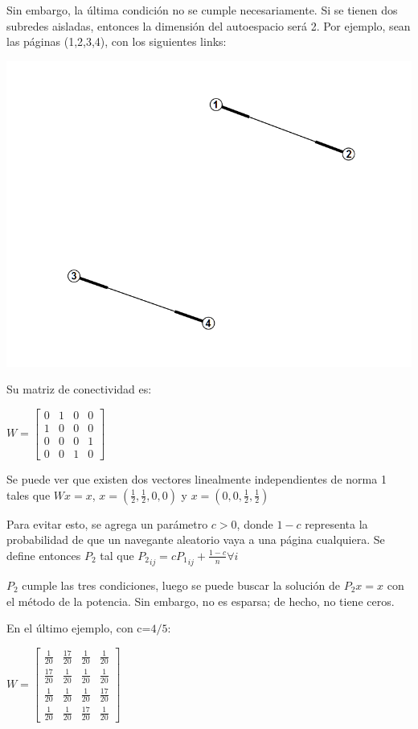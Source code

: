 \documentclass[a4paper]{article}
\begin{document}
Sin embargo, la última condición no se cumple necesariamente. Si se tienen dos subredes aisladas, entonces la dimensión del autoespacio será 2. Por ejemplo, sean las páginas (1,2,3,4), con los siguientes links: 

\includegraphics[scale=0.5]{img/Grafo2.png} 

Su matriz de conectividad es:
\begin{center}
$W=\begin{bmatrix} 0&1&0&0\\1&0&0&0\\ 0&0&0&1\\0&0&1&0\end{bmatrix}$
\end{center}
Se puede ver que existen dos vectores linealmente independientes de norma 1 tales que $Wx=x$, $x=\left( \frac{1}{2}, \frac{1}{2},0 ,0\right)$ y $x=\left(0,0,\frac{1}{2}, \frac{1}{2} \right)$ 

Para evitar esto, se agrega un parámetro $c>0$, donde $1-c$ representa la probabilidad de que un navegante aleatorio vaya a una página cualquiera. Se define entonces $P_2$ tal que
${P_2}_{ij} = c{P_1}_{ij} + \frac{1-c}{n}  \forall i$

$P_2$ cumple las tres condiciones, luego se puede buscar la solución de $P_2x=x$ con el método de la potencia. Sin embargo, no es esparsa; de hecho, no tiene ceros.

En el último ejemplo, con c=$4/5$:
\begin{center}
$W=\begin{bmatrix} \frac{1}{20}&\frac{17}{20}&\frac{1}{20}&\frac{1}{20}\\\frac{17}{20}&\frac{1}{20}&\frac{1}{20}&\frac{1}{20}\\ \frac{1}{20}&\frac{1}{20}&\frac{1}{20}&\frac{17}{20}\\\frac{1}{20}&\frac{1}{20}&\frac{17}{20}&\frac{1}{20}\end{bmatrix}$
\end{center}
\end{document}
